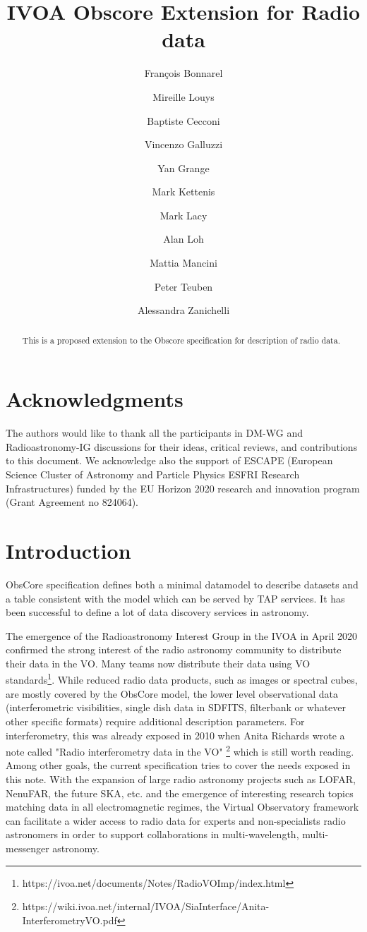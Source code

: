\documentclass[11pt,a4paper]{ivoa}
\title{IVOA Obscore Extension for Radio data}
\author{Fran\c cois Bonnarel}
\author{Mireille Louys}
\author{Baptiste Cecconi}
\author{Vincenzo Galluzzi}
\author{Yan Grange}
\author{Mark Kettenis}
\author{Mark Lacy}
\author{Alan Loh}
\author{Mattia Mancini}
\author{Peter Teuben}
\author{Alessandra Zanichelli}
\begin{document}
\begin{abstract}
This is a proposed extension to the Obscore specification for description of radio data.
\end{abstract}

\section*{Acknowledgments}

The authors would like to thank all the participants in DM-WG and Radioastronomy-IG discussions 
for their ideas, critical reviews, and contributions to this document.
We acknowledge also the support of  ESCAPE (European Science Cluster of Astronomy
and Particle Physics ESFRI Research Infrastructures) funded by the EU Horizon
2020 research and innovation program (Grant Agreement no 824064).

\section{Introduction}


ObsCore specification \citep{2017ivoa.spec.0509L} defines both a minimal datamodel to describe datasets 
and a table consistent with the model which can be served by TAP services. It has been successful 
to define a lot of data discovery services in astronomy.

The emergence  of  the Radioastronomy Interest Group in the IVOA in April 2020 confirmed the strong 
interest of the radio astronomy community to distribute their data in the VO. Many teams now 
distribute their data using VO standards\footnote{https://ivoa.net/documents/Notes/RadioVOImp/index.html}. 
While reduced radio data products, such as images or spectral cubes, %
are mostly covered by the ObsCore model, the lower level observational data 
(interferometric visibilities, single dish data in SDFITS, filterbank or whatever other specific formats) require additional description parameters. For interferometry, this was already exposed 
in 2010 when Anita Richards wrote a note called "Radio interferometry data in the VO" 
\footnote{https://wiki.ivoa.net/internal/IVOA/SiaInterface/Anita-InterferometryVO.pdf} which is 
still worth reading. Among other goals, the current specification tries to cover the needs exposed in this note. 
With the expansion of large radio astronomy projects such as LOFAR, NenuFAR, the future SKA, etc. 
and the emergence of interesting research topics matching data in all electromagnetic regimes, the 
Virtual Observatory framework can facilitate a wider access to radio data for experts and 
non-specialists radio astronomers in order to support collaborations in multi-wavelength, 
multi-messenger astronomy. 
\end{document}
